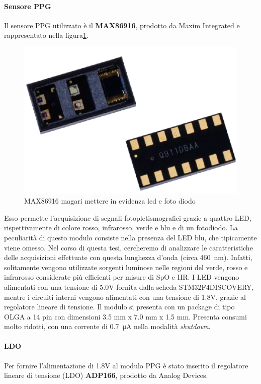 \paragraph{Sensore PPG} Il sensore PPG utilizzato è il \textbf{MAX86916}, prodotto da Maxim Integrated e rappresentato nella figura\ref{fig:ImmagineMAX86916}.
\begin{figure}[b]
	\centering
	\includegraphics[width=0.6\linewidth]{ImageFiles/Hardware/ImmagineMAX86916}
	\caption{MAX86916 magari mettere in evidenza led e foto diodo}
	\label{fig:ImmagineMAX86916}
\end{figure}
Esso permette l'acquisizione di segnali fotopletismografici grazie a quattro LED, rispettivamente di colore rosso, infrarosso, verde e blu e di un fotodiodo. La peculiarità di questo modulo consiste nella presenza del LED blu, che tipicamente viene omesso. Nel corso di questa tesi, cercheremo di analizzare le caratteristiche delle acquisizioni effettuate con questa lunghezza d'onda (circa \SI{460}{\nano\meter}). Infatti, solitamente vengono utilizzate sorgenti luminose nelle regioni del verde, rosso e infrarosso considerate più efficienti per misure di SpO e HR. I LED vengono alimentati con una tensione di 5.0V  fornita dalla scheda STM32F4DISCOVERY, mentre i circuiti interni vengono alimentati con una tensione di 1.8V, grazie al regolatore lineare di tensione. Il modulo si presenta con un package di tipo OLGA a 14 pin con dimensioni 3.5 mm x 7.0 mm x 1.5 mm. Presenta consumi molto ridotti, con una corrente di \SI{0.7}{\micro\ampere} nella modalità \textit{shutdown}.

\paragraph{LDO} Per fornire l'alimentazione di 1.8V al modulo PPG è stato inserito il regolatore lineare di tensione (LDO) \textbf{ADP166}, prodotto da Analog Devices\cite{AnalogDevicesADP166}.

